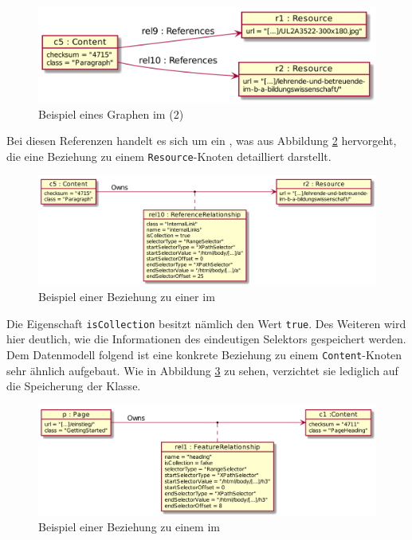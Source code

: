     \begin{figure}[htb]
        \centering
        \includegraphics[scale=\imageScalingFactor]{../resources/db-data-model/example/example_part2.png}
        \caption{Beispiel eines Graphen im {\classificationStorage} (2)}
        \label{image:dbDataModelExampleOverviewPart2}
    \end{figure}

    Bei diesen Referenzen handelt es sich um ein {\collectionFeature},
    was aus Abbildung \ref{image:dbDataModelExampleRel10} hervorgeht,
    die eine Beziehung zu einem \texttt{Resource}-Knoten detailliert darstellt.

    \begin{figure}[htb]
        \centering
        \includegraphics[scale=\imageScalingFactor]{../resources/db-data-model/example/c5-r2.png}
        \caption{Beispiel einer Beziehung zu einer {\resource} im {\classificationStorage}}
        \label{image:dbDataModelExampleRel10}
    \end{figure}

    Die Eigenschaft \texttt{isCollection} besitzt nämlich den Wert \texttt{true}.
    Des Weiteren wird hier deutlich, wie die Informationen des eindeutigen Selektors gespeichert werden.
    Dem Datenmodell folgend ist eine konkrete Beziehung zu einem \texttt{Content}-Knoten
    sehr ähnlich aufgebaut. Wie in Abbildung \ref{image:dbDataModelExampleRel1} zu sehen,
    verzichtet sie lediglich auf die Speicherung der Klasse.

    \begin{figure}[htb]
        \centering
        \includegraphics[scale=\imageScalingFactor]{../resources/db-data-model/example/p-c1.png}
        \caption{Beispiel einer Beziehung zu einem {\contentFeature} im {\classificationStorage}}
        \label{image:dbDataModelExampleRel1}
    \end{figure}
